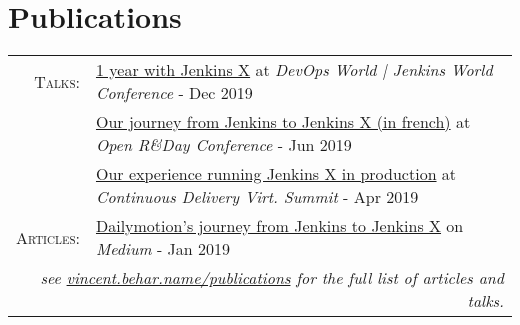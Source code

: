 \documentclass[a4paper,11pt]{article}
\begin{document}
\section{Publications}
\begin{tabular}{rl}
    \textsc{Talks:}&\href{https://vincent.behar.name/publications/2019-12-dwjw-lisbon/}{1 year with Jenkins X} at \textit{DevOps World | Jenkins World Conference} - Dec 2019\\
    &\href{https://vincent.behar.name/publications/2019-06-openrday/}{Our journey from Jenkins to Jenkins X (in french)} at \textit{Open R\&Day Conference} - Jun 2019\\
    &\href{https://vincent.behar.name/publications/2019-04-cdconference/}{Our experience running Jenkins X in production} at \textit{Continuous Delivery Virt. Summit} - Apr 2019\\
    \textsc{Articles:}&\href{https://vincent.behar.name/publications/2019-01-article-from-jenkins-to-jenkins-x/}{Dailymotion's journey from Jenkins to Jenkins X} on \textit{Medium} - Jan 2019\\
  \multicolumn{2}{r}{\footnotesize\itshape see \href{https://vincent.behar.name/publications}{vincent.behar.name/publications} for the full list of articles and talks.}\\
\end{tabular}
\end{document}

